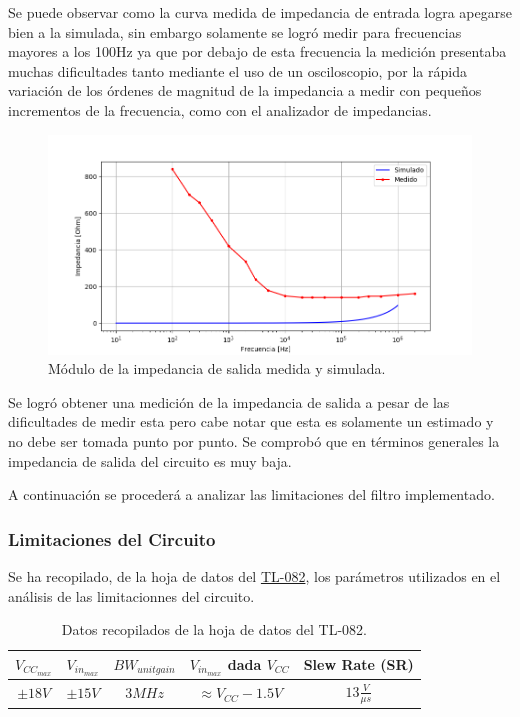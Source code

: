Se puede observar como la curva medida de impedancia de entrada logra apegarse bien a la simulada, sin embargo solamente se logró medir para frecuencias mayores a los 100Hz ya que por debajo de esta frecuencia la medición presentaba muchas dificultades tanto mediante el uso de un osciloscopio, por la rápida variación de los órdenes de magnitud de la impedancia a medir con pequeños incrementos de la frecuencia, como con el analizador de impedancias.

\begin{figure}[H]
	\centering
	\includegraphics[width=\textwidth]{Imagenes1/gic_zout_calibrado.png}
	\caption{Módulo de la impedancia de salida medida y simulada.}
	\label{fig:bode_calc_sim_med_cal}
\end{figure}

Se logró obtener una medición de la impedancia de salida a pesar de las dificultades de medir esta pero cabe notar que esta es solamente un estimado y no debe ser tomada punto por punto. Se comprobó que en términos generales la impedancia de salida del circuito es muy baja.

A continuación se procederá a analizar las limitaciones del filtro implementado.

\subsubsection{Limitaciones del Circuito}
\label{sec:limitaciones}

Se ha recopilado, de la hoja de datos del \href{http://www.ti.com/lit/ds/symlink/tl082.pdf}{TL-082}, los parámetros utilizados en el análisis de las limitacionnes del circuito.

\begin{table}[H]
\centering
\begin{tabular}{@{}ccccc@{}}
\toprule
$V_{CC_{max}}$ & $V_{in_{max}}$ & $BW_{unitgain}$ & $V_{in_{max}}$ dada $V_{CC}$ & Slew Rate (SR)\\ \midrule
$\pm 18V$ & $\pm 15V$ & $3MHz$ & $\approx V_{CC}-1.5V$ & $13\frac{V}{\mu s}$\\ \bottomrule
\end{tabular}
\caption{Datos recopilados de la hoja de datos del TL-082.}
\label{tab:datos_tl082}
\end{table}


